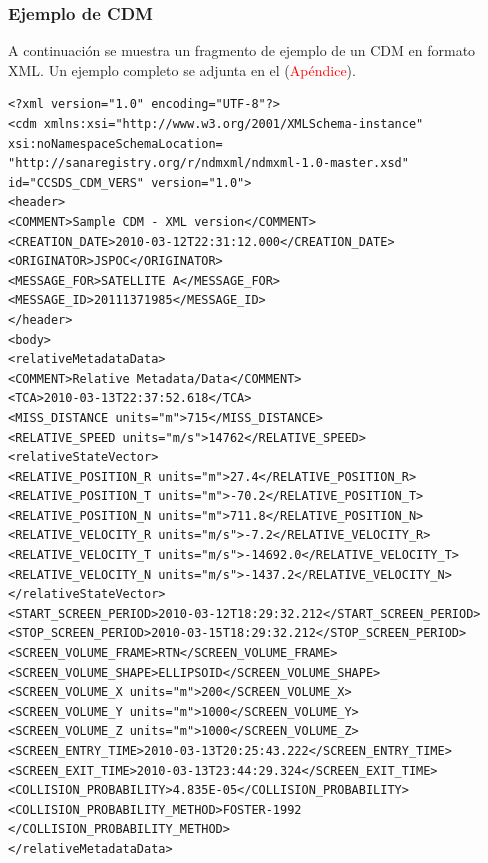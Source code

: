 \begin{center}
\end{center}


\subsubsection*{Ejemplo de CDM}
A continuaci\'on se muestra un fragmento de ejemplo de un CDM en formato XML. Un ejemplo completo se adjunta en el (\textcolor{red}{Ap\'endice}).\\

\lstset{language=XML,basicstyle=\small}
\begin{lstlisting}
<?xml version="1.0" encoding="UTF-8"?>
<cdm xmlns:xsi="http://www.w3.org/2001/XMLSchema-instance"
xsi:noNamespaceSchemaLocation=
"http://sanaregistry.org/r/ndmxml/ndmxml-1.0-master.xsd"
id="CCSDS_CDM_VERS" version="1.0">
<header>
<COMMENT>Sample CDM - XML version</COMMENT>
<CREATION_DATE>2010-03-12T22:31:12.000</CREATION_DATE>
<ORIGINATOR>JSPOC</ORIGINATOR>
<MESSAGE_FOR>SATELLITE A</MESSAGE_FOR>
<MESSAGE_ID>20111371985</MESSAGE_ID>
</header>
<body>
<relativeMetadataData>
<COMMENT>Relative Metadata/Data</COMMENT>
<TCA>2010-03-13T22:37:52.618</TCA>
<MISS_DISTANCE units="m">715</MISS_DISTANCE>
<RELATIVE_SPEED units="m/s">14762</RELATIVE_SPEED>
<relativeStateVector>
<RELATIVE_POSITION_R units="m">27.4</RELATIVE_POSITION_R>
<RELATIVE_POSITION_T units="m">-70.2</RELATIVE_POSITION_T>
<RELATIVE_POSITION_N units="m">711.8</RELATIVE_POSITION_N>
<RELATIVE_VELOCITY_R units="m/s">-7.2</RELATIVE_VELOCITY_R>
<RELATIVE_VELOCITY_T units="m/s">-14692.0</RELATIVE_VELOCITY_T>
<RELATIVE_VELOCITY_N units="m/s">-1437.2</RELATIVE_VELOCITY_N>
</relativeStateVector>
<START_SCREEN_PERIOD>2010-03-12T18:29:32.212</START_SCREEN_PERIOD>
<STOP_SCREEN_PERIOD>2010-03-15T18:29:32.212</STOP_SCREEN_PERIOD>
<SCREEN_VOLUME_FRAME>RTN</SCREEN_VOLUME_FRAME>
<SCREEN_VOLUME_SHAPE>ELLIPSOID</SCREEN_VOLUME_SHAPE>
<SCREEN_VOLUME_X units="m">200</SCREEN_VOLUME_X>
<SCREEN_VOLUME_Y units="m">1000</SCREEN_VOLUME_Y>
<SCREEN_VOLUME_Z units="m">1000</SCREEN_VOLUME_Z>
<SCREEN_ENTRY_TIME>2010-03-13T20:25:43.222</SCREEN_ENTRY_TIME>
<SCREEN_EXIT_TIME>2010-03-13T23:44:29.324</SCREEN_EXIT_TIME>
<COLLISION_PROBABILITY>4.835E-05</COLLISION_PROBABILITY>
<COLLISION_PROBABILITY_METHOD>FOSTER-1992
</COLLISION_PROBABILITY_METHOD>
</relativeMetadataData>
\end{lstlisting}

